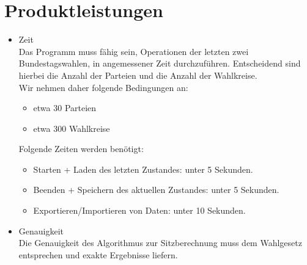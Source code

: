 \documentclass[10pt,a4paper]{article}
\begin{document}
\section{Produktleistungen}
\begin{itemize}
	\item Zeit \hfill \\
	Das Programm muss fähig sein, Operationen der letzten zwei Bundestagswahlen, in angemessener Zeit durchzuführen. Entscheidend sind hierbei die Anzahl der Parteien und die Anzahl der Wahlkreise.
	\\ Wir nehmen daher folgende Bedingungen an:
	\begin{itemize}
		\item etwa 30 Parteien
		\item etwa 300 Wahlkreise
	\end{itemize}
	Folgende Zeiten werden benötigt:
	\begin{itemize}
		\item Starten + Laden des letzten Zustandes: unter 5 Sekunden.
		\item Beenden + Speichern des aktuellen Zustandes: unter 5 Sekunden.
		\item Exportieren/Importieren von Daten: unter 10 Sekunden.
	\end{itemize}
	\item Genauigkeit \hfill \\
	Die Genauigkeit des Algorithmus zur Sitzberechnung muss dem Wahlgesetz entsprechen und exakte Ergebnisse liefern.
\end{itemize}
\end{document}
